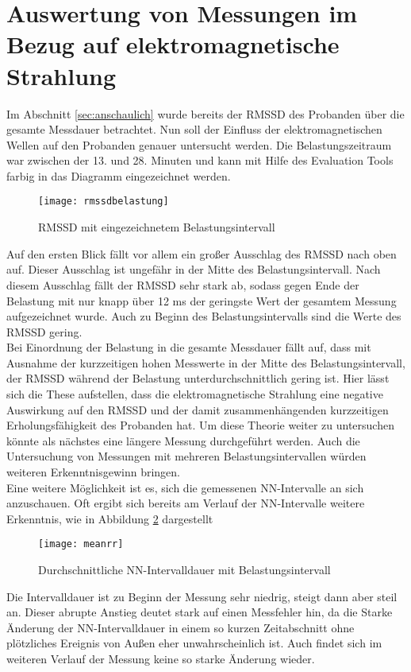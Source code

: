 \section{Auswertung von Messungen im Bezug auf elektromagnetische Strahlung}
Im Abschnitt \ref{sec:anschaulich} wurde bereits der RMSSD des Probanden über die gesamte Messdauer betrachtet. Nun soll der Einfluss der elektromagnetischen Wellen auf den Probanden genauer untersucht werden. Die Belastungszeitraum war zwischen der 13. und 28. Minuten und kann mit Hilfe des Evaluation Tools farbig in das Diagramm eingezeichnet werden.
\begin{figure}[H]
	\centering
	\texttt{[image: rmssdbelastung]}
	\caption{RMSSD mit eingezeichnetem Belastungsintervall}
	\label{fig:rmssdbelastung}
\end{figure}
Auf den ersten Blick fällt vor allem ein großer Ausschlag des RMSSD nach oben auf. Dieser Ausschlag ist ungefähr in der Mitte des Belastungsintervall. Nach diesem Ausschlag fällt der RMSSD sehr stark ab, sodass gegen Ende der Belastung mit nur knapp über 12 ms der geringste Wert der gesamtem Messung aufgezeichnet wurde. Auch zu Beginn des Belastungsintervalls sind die Werte des RMSSD gering. \\
Bei Einordnung der Belastung in die gesamte Messdauer fällt auf, dass mit Ausnahme der kurzzeitigen hohen Messwerte in der Mitte des Belastungsintervall, der RMSSD während der Belastung unterdurchschnittlich gering ist. Hier lässt sich die These aufstellen, dass die elektromagnetische Strahlung eine negative Auswirkung auf den RMSSD und der damit zusammenhängenden kurzzeitigen Erholungsfähigkeit des Probanden hat. Um diese Theorie weiter zu untersuchen könnte als nächstes eine längere Messung durchgeführt werden. Auch die Untersuchung von Messungen mit mehreren Belastungsintervallen würden weiteren Erkenntnisgewinn bringen. \\
Eine weitere Möglichkeit ist es, sich die gemessenen NN-Intervalle an sich anzuschauen. Oft ergibt sich bereits am Verlauf der NN-Intervalle weitere Erkenntnis, wie in Abbildung \ref{fig:meanrr} dargestellt
\begin{figure}[H]
	\centering
	\texttt{[image: meanrr]}
	\caption{Durchschnittliche NN-Intervalldauer mit Belastungsintervall }
	\label{fig:meanrr}
\end{figure}

Die Intervalldauer ist zu Beginn der Messung sehr niedrig, steigt dann aber steil an. Dieser abrupte Anstieg deutet stark auf einen Messfehler hin, da die Starke Änderung der NN-Intervalldauer in einem so kurzen Zeitabschnitt ohne plötzliches Ereignis von Außen eher unwahrscheinlich ist. Auch findet sich im weiteren Verlauf der Messung keine so starke Änderung wieder.\\


